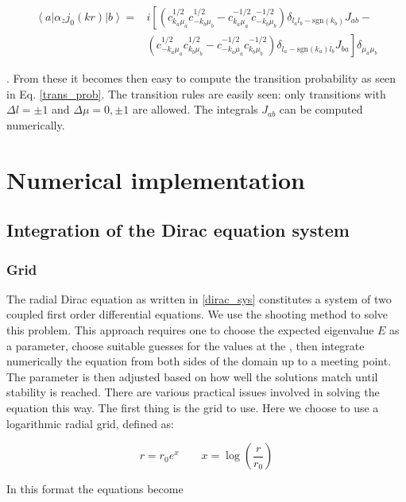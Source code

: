 \documentclass[]{report}
\newcommand{\bra}[1]{\left<#1\right|}
\newcommand{\ket}[1]{\left|#1\right>}
\newcommand{\braket}[3]{\bra{#1}#2\ket{#3}}
\begin{document}
\begin{align}\label{matel_alphazj0}
\braket{a}{\alpha_zj_0(kr)}{b} = & i\left[\left(c_{k_a\mu_a}^{1/2} c_{-k_b\mu_b}^{1/2}-
 c_{k_a\mu_a}^{-1/2} c_{-k_b\mu_b}^{-1/2}\right)
\delta_{l_al_b-\mathrm{sgn}(k_b)} J_{ab}  - \right. \\
&\left. 
\left(c_{-k_a\mu_a}^{1/2} c_{k_b\mu_b}^{1/2}-
c_{-k_a\mu_a}^{-1/2} c_{k_b\mu_b}^{-1/2}\right)\delta_{l_a-\mathrm{sgn}(k_a)l_b} J_{ba} 
\right]\delta_{\mu_a\mu_b} \nonumber
\end{align}

. From these it becomes then easy to compute the transition probability as seen in Eq. \ref{trans_prob}. The transition rules are easily seen: only transitions with $\Delta l = \pm 1$ and $\Delta \mu = 0, \pm1$ are allowed. The integrals $J_{ab}$ can be computed numerically.

\chapter{Numerical implementation}

\section{Integration of the Dirac equation system}

\subsection{Grid}

The radial Dirac equation as written in \ref{dirac_sys} constitutes a system of two coupled first order differential equations. We use the shooting method to solve this problem. This approach requires one to choose the expected eigenvalue $E$ as a parameter, choose suitable guesses for the values at the 
, then integrate numerically the equation from both sides of the domain up to a meeting point. The parameter is then adjusted based on how well the solutions match until stability is reached.\newline
There are various practical issues involved in solving the equation this way. The first thing is the grid to use. Here we choose to use a logarithmic radial grid, defined as:

\begin{equation}
r = r_0e^x \qquad x = \log\left(\frac{r}{r_0}\right)
\end{equation}

In this format the equations become
\end{document}

